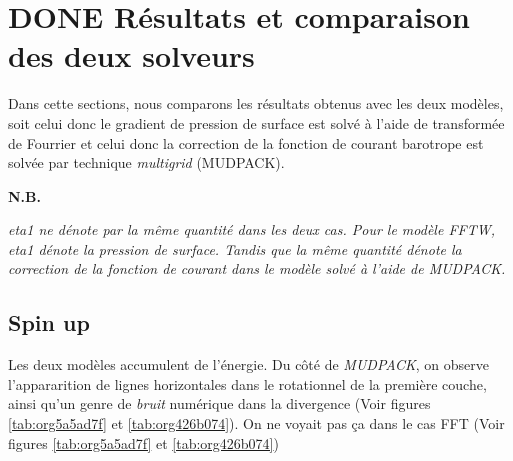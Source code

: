 \documentclass[10pt]{article}
\numberwithin{equation}{section}
\newcommand{\nb}{\textbf{N.B.}\hspace{4pt}}
\begin{document}
\section{{\bfseries\sffamily DONE} Résultats et comparaison des deux solveurs}
\label{sec:org146bd30}
Dans cette sections, nous comparons les résultats obtenus avec les deux modèles, soit celui donc le gradient de pression de surface est solvé à l'aide de transformée de Fourrier et celui donc la correction de la fonction de courant barotrope est solvée par technique \emph{multigrid} (MUDPACK).\bigskip

\nb\begin{minipage}[t]{0.9\linewidth}
\itshape 
eta1 ne dénote par la même quantité dans les deux cas.
Pour le modèle FFTW, eta1 dénote la pression de surface.
Tandis que la même quantité dénote la correction de la fonction de courant dans le modèle solvé à l'aide de MUDPACK.   
\end{minipage}
\newpage

\subsection{Spin up}
\label{sec:org55b18d2}
Les deux modèles accumulent de l'énergie.
Du côté de \emph{MUDPACK}, on observe l'appararition de lignes horizontales dans le rotationnel de la première couche, ainsi qu'un genre de \emph{bruit} numérique dans la divergence (Voir figures \ref{tab:org5a5ad7f} et \ref{tab:org426b074}).
On ne voyait pas ça dans le cas FFT (Voir figures \ref{tab:org5a5ad7f} et \ref{tab:org426b074})
\end{document}
